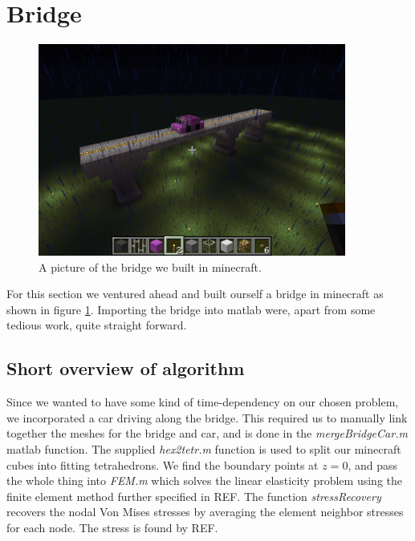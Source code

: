 \section{Bridge}

\begin{figure}
\center
\includegraphics[trim=0cm 5cm 7cm 7cm, clip=true, width=0.9\textwidth]{pic_bridge}
\caption{A picture of the bridge we built in minecraft.}
\label{fig:picBridge}
\end{figure}

For this section we ventured ahead and built ourself a bridge in minecraft as shown in figure \ref{fig:picBridge}. Importing the bridge into matlab were, apart from some tedious work, quite straight forward.

\subsection{Short overview of algorithm}
Since we wanted to have some kind of time-dependency on our chosen problem, we incorporated a car driving along the bridge. This required us to manually link together the meshes for the bridge and car, and is done in the \textit{mergeBridgeCar.m} matlab function. The supplied \textit{hex2tetr.m} function is used to split our minecraft cubes into fitting tetrahedrons. We find the boundary points at $z = 0$, and pass the whole thing into \textit{FEM.m} which solves the linear elasticity problem using the finite element method further specified in REF. The function \textit{stressRecovery} recovers the nodal Von Mises stresses by averaging the element  neighbor stresses for each node. The stress is found by REF.


